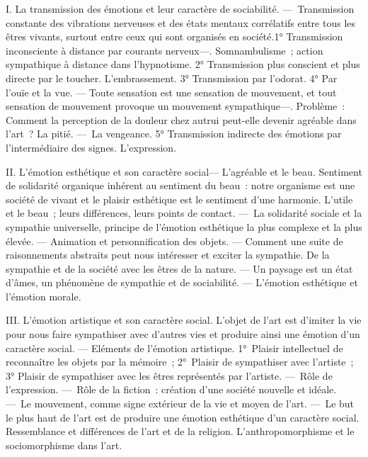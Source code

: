 \documentclass[french,twoside]{book} %
\newcommand\chaptercont{} %
\begin{document}
\chaptercont
\noindent I. La transmission des émotions et leur caractère de sociabilité. — Transmission constante des vibrations nerveuses et des états mentaux corrélatifs entre tous les êtres vivants, surtout entre ceux qui sont organisés en société.1° Transmission inconsciente à distance par courants nerveux—. Somnambulisme ; action sympathique à distance dans l’hypnotisme. 2° Transmission plus conscient et plus directe par le toucher. L’embrassement. 3° Transmission par l’odorat. 4° Par l’ouïe et la vue. — Toute sensation est une sensation de mouvement, et tout sensation de mouvement provoque un mouvement sympathique—. Problème : Comment la perception de la douleur chez autrui peut-elle devenir agréable dans l’art ? La pitié. — La vengeance. 5° Transmission indirecte des émotions par l’intermédiaire des signes. L’expression.\par
II. L’émotion esthétique et son caractère social— L’agréable et le beau. Sentiment de solidarité organique inhérent au sentiment du beau : notre organisme est une société de vivant et le plaisir esthétique est le sentiment d’une harmonie. L’utile et le beau ; leurs différences, leurs points de contact. — La solidarité sociale et la sympathie universelle, principe de l’émotion esthétique la plus complexe et la plus élevée. — Animation et personnification des objets. — Comment une suite de raisonnements abstraits peut nous intéresser et exciter la sympathie. De la sympathie et de la société avec les êtres de la nature. — Un paysage est un état d’âmes, un phénomène de sympathie et de sociabilité. — L’émotion esthétique et l’émotion morale.\par
III. L’émotion artistique et son caractère social. L’objet de l’art est d’imiter la vie pour nous faire sympathiser avec d’autres vies et produire ainsi une émotion d’un caractère social. — Eléments de l’émotion artistique. 1° Plaisir intellectuel de reconnaître les objets par la mémoire ; 2° Plaisir de sympathiser avec l’artiste ; 3° Plaisir de sympathiser avec les êtres représentés par l’artiste. — Rôle de l’expression. — Rôle de la fiction : création d’une société nouvelle et idéale. — Le mouvement, comme signe extérieur de la vie et moyen de l’art. — Le but le plus haut de l’art est de produire une émotion esthétique d’un caractère social. Ressemblance et différences de l’art et de la religion. L’anthropomorphisme et le sociomorphisme dans l’art.\par
\end{document}
